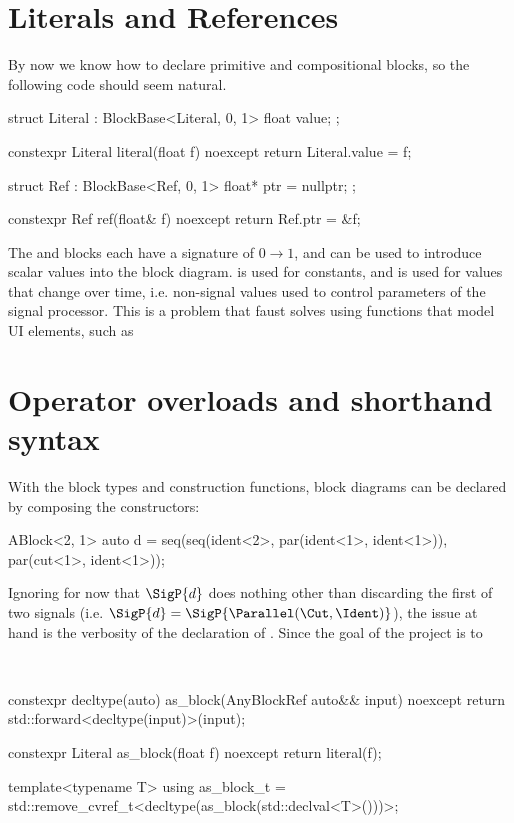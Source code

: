 \section{Literals and References}

By now we know how to declare primitive and compositional blocks, so the following code should seem natural.
\begin{cppcodenl}
  struct Literal : BlockBase<Literal, 0, 1> {
    float value;
  };

  constexpr Literal literal(float f) noexcept {
    return Literal{.value = f};
  }
  
  struct Ref : BlockBase<Ref, 0, 1> {
    float* ptr = nullptr;
  };

  constexpr Ref ref(float& f) noexcept
  {
    return Ref{.ptr = &f};
  }
\end{cppcodenl}

The  and  blocks each have a signature of $0 \rightarrow 1$, and can be used to
introduce scalar values into the block diagram.  is used for constants, and  is used for values that change
over time, i.e. non-signal values used to control parameters of the signal processor. This is a problem that
faust solves using functions that model UI elements, such as \autocite{orlarey2004}

\section{Operator overloads and shorthand syntax}

With the block types and construction functions, block diagrams can be declared by composing the
constructors:

\begin{cppcodenl}
  ABlock<2, 1> auto d = seq(seq(ident<2>, par(ident<1>, ident<1>)), par(cut<1>, ident<1>));
\end{cppcodenl}

Ignoring for now that $\SigP{d}$ does nothing other than discarding the first of two signals (i.e.
$\SigP{d} = \SigP{\Parallel(\Cut, \Ident)}$), the issue at hand is the verbosity of the declaration of .
Since the goal of the project is to

\\
\begin{cppcodenl}
  constexpr decltype(auto) as_block(AnyBlockRef auto&& input) noexcept
  {
    return std::forward<decltype(input)>(input);
  }

  constexpr Literal as_block(float f) noexcept
  {
    return literal(f);
  }

  template<typename T>
  using as_block_t = std::remove_cvref_t<decltype(as_block(std::declval<T>()))>;
\end{cppcodenl}

